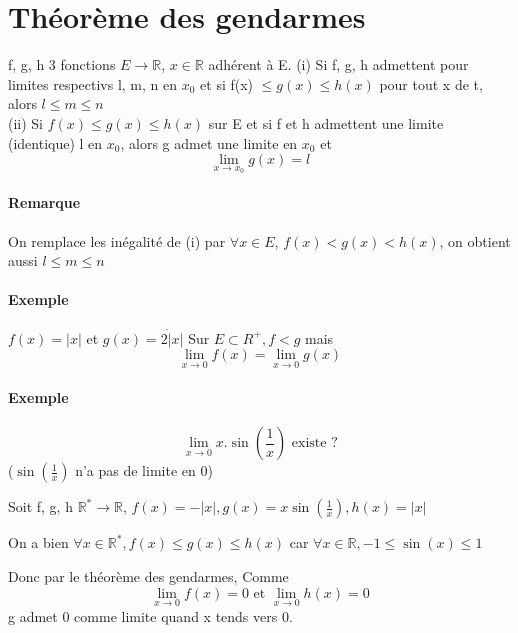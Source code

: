 \section{Théorème des gendarmes}
f, g, h 3 fonctions $E \rightarrow \mathbb{R}$, $x\in \mathbb{R}$ adhérent à E. \newline
(i) Si f, g, h admettent pour limites respectivs l, m, n en $x_0$ et si f(x) $\leq g(x) \leq h(x)$ pour tout x de t, alors $l \leq m \leq n$
~\\
(ii) Si $f(x) \leq g(x) \leq h(x)$ sur E et si f et h admettent une limite (identique) l en $x_0$, alors g admet une limite en $x_0$ et \[\lim_{x \to x_0} g(x) = l\]

\paragraph{Remarque} On remplace les inégalité de (i) par $\forall x \in E$, $f(x) < g(x) < h(x)$, on obtient aussi $l \leq m \leq n$

\paragraph{Exemple} $f(x) = |x|$ et $g(x) = 2\dot |x|$ Sur $E \subset R^+, f<g$ mais \[\lim_{x \to 0}f(x) = \lim_{x \to 0} g(x) \]

\paragraph{Exemple} \[\lim_{x \to 0} x .\sin(\frac{1}{x}) \text{ existe ?}\]
($\sin(\frac{1}{x})$ n'a pas de limite en 0)

Soit f, g, h $\mathbb{R}^* \rightarrow \mathbb{R}$, $f(x) = -|x|, g(x) = x \sin(\frac{1}{x}), h(x) = |x|$

On a bien $\forall x \in \mathbb{R}^*, f(x) \leq g(x) \leq h(x)$ car $\forall x \in \mathbb{R}, -1 \leq \sin(x) \leq 1$

Donc par le théorème des gendarmes, Comme \[\lim_{x \to 0} f(x) = 0 \text{ et } \lim_{x \to 0} h(x) = 0\] g admet 0 comme limite quand x tends vers 0.
